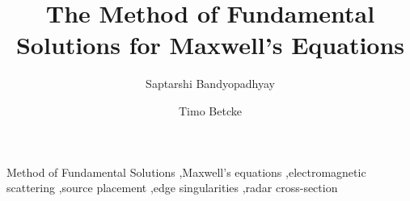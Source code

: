 \documentclass[preprint,12pt]{elsarticle}
\begin{document}
\begin{frontmatter}

\title{The Method of Fundamental Solutions for Maxwell's Equations}

\author[inst1]{Saptarshi Bandyopadhyay}

\author[inst1]{Timo Betcke}


\begin{abstract}

\end{abstract}


\begin{keyword}
Method of Fundamental Solutions \sep Maxwell's equations \sep electromagnetic scattering \sep source placement \sep edge singularities \sep radar cross-section
\end{keyword}

\end{frontmatter}









\end{document}
